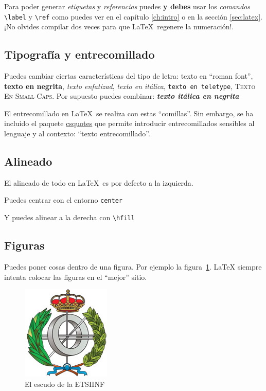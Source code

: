 Para poder generar \emph{etiquetas} y \emph{referencias} puedes
\textbf{y debes} usar los \emph{comandos} \verb|\label| y
\verb|\ref| como puedes ver en el capítulo \ref{ch:intro} o en la
sección \ref{sec:latex}. ¡No olvides compilar dos veces para que
\LaTeX\ regenere la numeración!.

\subsection{Tipografía y entrecomillado}

Puedes cambiar ciertas características del tipo de letra: \textrm{texto en ``roman font''}, \textbf{texto en negrita}, \emph{texto enfatizad}, \textit{texto en itálica}, \texttt{texto en teletype}, \textsc{Texto En Small Caps}. Por supuesto puedes combinar: \textbf{\textit{texto itálica en negrita}}

El entrecomillado en \LaTeX\ se realiza con estas ``comillas''. Sin
embargo, se ha incluido el paquete \url{csquotes} que permite
introducir entrecomillados sensibles al lenguaje y al contexto:
\enquote{texto entrecomillado}.


\subsection{Alineado}
El alineado de todo en \LaTeX\ es por defecto a la izquierda.

\begin{center}
  Puedes centrar con el entorno \verb!center!
\end{center}

\hfill
Y puedes alinear a la derecha con \verb!\hfill!

\subsection{Figuras}

Puedes poner cosas dentro de una figura. Por ejemplo la
figura~\ref{fig:escudo}. LaTeX siempre intenta colocar las figuras en
el ``mejor'' sitio.

\begin{figure}[h]
  \centering
  \includegraphics[width=0.33\linewidth]{include/escudo_etsiinf}
  \caption{El escudo de la ETSIINF}
  \label{fig:escudo}
\end{figure}

